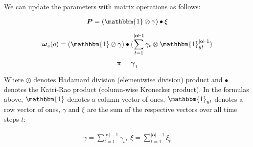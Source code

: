 We can update the parameters with matrix operations as follows:

\begin{equation}
    \boldsymbol{P} = (\mathbbm{1} \oslash \gamma) \bullet \xi
    \label{eq:transition-probabilities-update}
\end{equation}

\begin{equation}
    \boldsymbol{\omega}_s(o) = (\mathbbm{1} \oslash \gamma) \bullet (\sum_{t=1}^{|\mathbf{o}|-1} \gamma_t \otimes \mathbbm{1}_{yt}^{|\mathbf{o}|-1})
    \label{eq:omega-update}
\end{equation}

\begin{equation}
    \boldsymbol{\pi} = \boldsymbol{\gamma}_1
    \label{eq:initial-probabilities-update}
\end{equation}

Where $\oslash$ denotes Hadamard division (elementwise division) product and $\bullet$ denotes the Katri-Rao product (column-wise Kronecker product).
In the formulas above, $\mathbbm{1}$ denotes a column vector of ones, $\mathbbm{1}_{yt}$ denotes a row vector of ones, $\gamma$ and $\xi$ are the sum of the respective vectors over all time steps $t$:

\begin{align}
    \gamma = \sum_{t=1}^{|\mathbf{o}|-1} \gamma_t, \;
    \xi = \sum_{t=1}^{|\mathbf{o}|-1} \xi_t
\end{align} 

